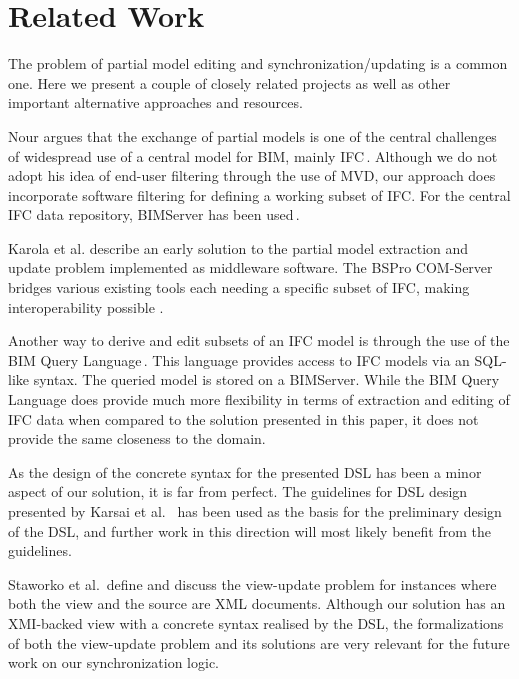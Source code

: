 \section{Related Work}
\label{sec:related_work}
The problem of partial model editing and synchronization/updating is a common one. Here we present a couple of closely related projects as well as other important alternative approaches and resources.

Nour argues that the exchange of partial models is one of the central challenges of widespread use of a central model for BIM, mainly IFC\,\cite{nour08}. Although we do not adopt his idea of end-user filtering through the use of MVD, our approach does incorporate software filtering for defining a working subset of IFC. For the central IFC data repository, BIMServer has been used\,\cite{beetz10}.

Karola et al. describe an early solution to the partial model extraction and update problem implemented as middleware software. The BSPro COM-Server bridges various existing tools each needing a specific subset of IFC, making interoperability possible \cite{karola02}.

Another way to derive and edit subsets of an IFC model is through the use of the BIM Query Language\,\cite{mazairac10}. This language provides access to IFC models via an SQL-like syntax. The queried model is stored on a BIMServer. While the BIM Query Language does provide much more flexibility in terms of extraction and editing of IFC data when compared to the solution presented in this paper, it does not provide the same closeness to the domain.

As the design of the concrete syntax for the presented DSL has been a minor aspect of our solution, it is far from perfect. The guidelines for DSL design presented by Karsai et al. \,\cite{karsai09} has been used as the basis for the preliminary design of the DSL, and further work in this direction will most likely benefit from the guidelines.

Staworko et al.\,\cite{staworko10} define and discuss the view-update problem for instances where both the view and the source are XML documents. Although our solution has an XMI-backed view with a concrete syntax realised by the DSL, the formalizations of both the view-update problem and its solutions are very relevant for the future work on our synchronization logic.

